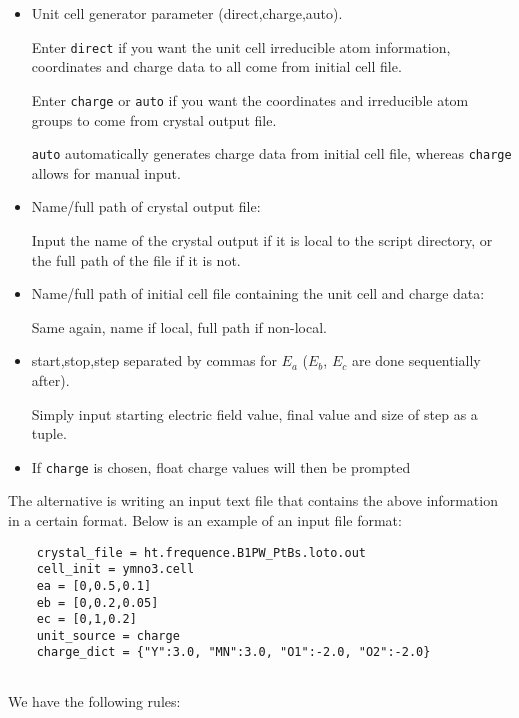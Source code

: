 \begin{itemize}
	\item Unit cell generator parameter (direct,charge,auto).
	
	Enter \texttt{direct} if you want the unit cell irreducible atom information, coordinates and charge data to all come from initial cell file.
	
	Enter \texttt{charge} or \texttt{auto} if you want the coordinates and irreducible atom groups to come from crystal output file.
	
	\texttt{auto} automatically generates charge data from initial cell file, whereas \texttt{charge} allows for manual input.
	
	\item Name/full path of crystal output file:
	
	Input the name of the crystal output if it is local to the script directory, or the full path of the file if it is not.
	
	\item Name/full path of initial cell file containing the unit cell and charge data:
	
	Same again, name if local, full path if non-local.
	
	\item start,stop,step separated by commas for $E_a$ ($E_b$, $E_c$ are done sequentially after).
	
	Simply input starting electric field value, final value and size of step as a tuple.
	
	\item If \texttt{charge} is chosen, float charge values will then be prompted
\end{itemize}

The alternative is writing an input text file that contains the above information in a certain format. Below is an example of an input file format:

\begin{lstlisting}
	crystal_file = ht.frequence.B1PW_PtBs.loto.out
	cell_init = ymno3.cell
	ea = [0,0.5,0.1]
	eb = [0,0.2,0.05]
	ec = [0,1,0.2]
	unit_source = charge
	charge_dict = {"Y":3.0, "MN":3.0, "O1":-2.0, "O2":-2.0}
	
\end{lstlisting}

We have the following rules:

